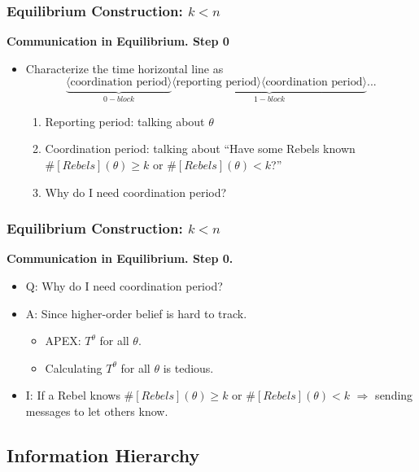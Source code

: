 \documentclass[10pt]{beamer}
\begin{document}
\begin{frame}
  \frametitle{Equilibrium Construction: $k<n$}

\textbf{Communication in Equilibrium. Step 0}
\begin{itemize}
\item Characterize the time horizontal line as 
\[\underbrace{\langle\text{coordination period}\rangle}_{0-block}\underbrace{\langle\text{reporting period}\rangle \langle\text{coordination period}\rangle}_{1-block}...\]

\begin{enumerate}
\item Reporting period: talking about $\theta$
\item Coordination period: talking about ``Have some Rebels known $\#[Rebels](\theta)\geq k$ or $\#[Rebels](\theta)< k$?'' 
\item Why do I need coordination period?
\end{enumerate}


\end{itemize}


\end{frame}


\begin{frame}
  \frametitle{Equilibrium Construction: $k<n$}

\textbf{Communication in Equilibrium. Step 0. }
\begin{itemize}
\item Q: Why do I need coordination period?
\item A: Since higher-order belief is hard to track.

\begin{itemize}
\item APEX: $T^{\theta}$ for all $\theta$.
\item Calculating $T^{\theta}$ for all $\theta$ is tedious.
\end{itemize}
\item I: If a Rebel knows $\#[Rebels](\theta)\geq k$ or $\#[Rebels](\theta)< k$ $\Rightarrow$ sending messages to let others know.
\end{itemize}


\end{frame}








\subsection{Information Hierarchy}
\end{document}
